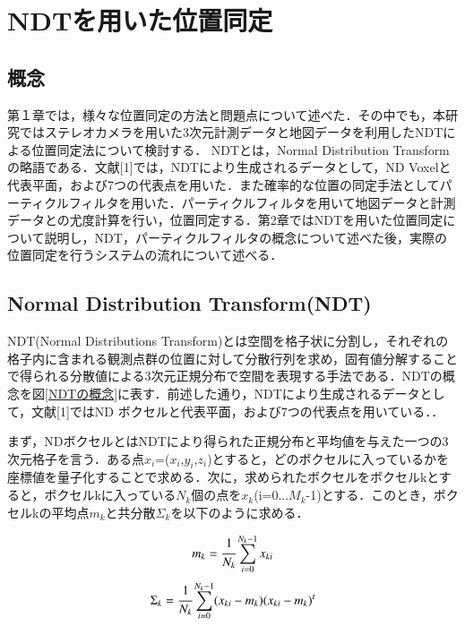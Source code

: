 %
\chapter{NDTを用いた位置同定}
\section{概念}
第１章では，様々な位置同定の方法と問題点について述べた．その中でも，本研究ではステレオカメラを用いた3次元計測データと地図データを利用したNDTによる位置同定法について検討する．
NDTとは，Normal Distribution Transformの略語である．文献[1]では，NDTにより生成されるデータとして，ND Voxelと代表平面，および7つの代表点を用いた．また確率的な位置の同定手法としてパーティクルフィルタを用いた．パーティクルフィルタを用いて地図データと計測データとの尤度計算を行い，位置同定する．第2章ではNDTを用いた位置同定について説明し，NDT，パーティクルフィルタの概念について述べた後，実際の位置同定を行うシステムの流れについて述べる．

\newpage
%
\section{Normal Distribution Transform(NDT)}
NDT(Normal Distributions Transform)とは空間を格子状に分割し，それぞれの格子内に含まれる観測点群の位置に対して分散行列を求め，固有値分解することで得られる分散値による3次元正規分布で空間を表現する手法である．NDTの概念を図{\ref{NDTの概念}}に表す．前述した通り，NDTにより生成されるデータとして，文献[1]ではND ボクセルと代表平面，および7つの代表点を用いている．．\par
まず，NDボクセルとはNDTにより得られた正規分布と平均値を与えた一つの3次元格子を言う．ある点$x_{i}$=($x_{i}$,$y_{i}$,$z_{i}$)とすると，どのボクセルに入っているかを座標値を量子化することで求める．次に，求められたボクセルをボクセルkとすると，ボクセルkに入っている$N_{k}$個の点を$x_{k}$(i=0...$M_{k}$-1)とする．このとき，ボクセルkの平均点$m_{k}$と共分散$ \Sigma_{k} $を以下のように求める．\par

\begin{equation}
m_{k}=\cfrac{1}{N_{k}}\sum_{i=0}^{N_{k}-1}x_{ki}
\end{equation}
\begin{equation}
\Sigma_{k}=\cfrac{1}{N_{k}}\sum_{i=0}^{N_{k}-1}(x_{ki}-m_{k})(x_{ki}-m_{k})^t
\end{equation}

